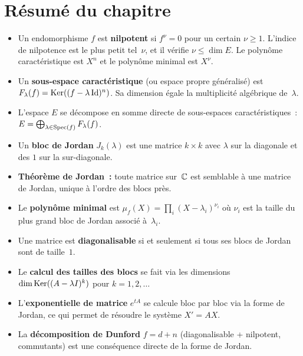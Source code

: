 \section*{Résumé du chapitre}

\begin{itemize}
  \item Un endomorphisme $f$ est \textbf{nilpotent}
    si $f^\nu=0$ pour un certain $\nu\geq 1$. L'indice de nilpotence
    est le plus petit tel~$\nu$, et il vérifie $\nu\leq\dim E$.
    Le polynôme caractéristique est $X^n$ et le polynôme minimal
    est $X^\nu$.

  \item Un \textbf{sous-espace caractéristique} (ou espace propre généralisé) est
    $F_\lambda(f)=\operatorname{Ker}((f-\lambda\operatorname{Id})^n)$. Sa dimension égale la
    multiplicité algébrique de~$\lambda$.

  \item L'espace $E$ se décompose en somme directe de sous-espaces
    caractéristiques~:
    $E=\bigoplus_{\lambda\in\operatorname{Spec}(f)}F_\lambda(f)$.

  \item Un \textbf{bloc de Jordan} $J_k(\lambda)$
    est une matrice $k\times k$ avec $\lambda$ sur la diagonale et des
    $1$ sur la sur-diagonale.

  \item \textbf{Théorème de Jordan~:}
    toute matrice sur~${\mathbb{C}}$ est semblable à une matrice de Jordan,
    unique à l'ordre des blocs près.

  \item Le \textbf{polynôme minimal}
    est $\mu_f(X)=\prod_i(X-\lambda_i)^{\nu_i}$ où $\nu_i$ est la
    taille du plus grand bloc de Jordan associé à~$\lambda_i$.

  \item Une matrice est \textbf{diagonalisable} si et seulement si tous
    ses blocs de Jordan sont de taille~$1$.

  \item Le \textbf{calcul des tailles des blocs}
    se fait via les dimensions $\dim\operatorname{Ker}((A-\lambda I)^k)$
    pour $k=1,2,\ldots$

  \item L'\textbf{exponentielle de matrice}
    $e^{tA}$ se calcule bloc par bloc via la forme de Jordan, ce qui
    permet de résoudre le système $X'=AX$.

  \item La \textbf{décomposition de Dunford}
    $f=d+n$ (diagonalisable + nilpotent, commutants) est une conséquence
    directe de la forme de Jordan.
\end{itemize}
